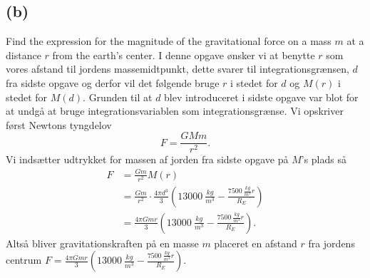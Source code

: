 \documentclass[12pt]{article}
\theoremstyle{definition}
\begin{document}
\subsection*{(b)}
Find the expression for the magnitude of the gravitational force on a mass $m$ at a distance $r$ from the earth's center.
\bigbreak
I denne opgave ønsker vi at benytte $r$ som vores afstand til jordens massemidtpunkt, dette svarer til integrationsgrænsen, $d$ fra sidste opgave og derfor vil det følgende bruge $r$ i stedet for $d$ og $M(r)$ i stedet for $M(d)$. Grunden til at $d$ blev introduceret i sidste opgave var blot for at undgå at bruge integrationsvariablen som integrationsgrænse.  Vi opskriver først Newtons tyngdelov
\[ 
  F = \frac{GMm}{r^2}
.\]
Vi indsætter udtrykket for massen af jorden fra sidste opgave på $M$'s plads så
\begin{align*}
  F &= \frac{Gm}{r^2}M(r) \\
  &= \frac{Gm}{r^2} \cdot \frac{4\pi d^3}{3} \left( \qty{13000}{\frac{kg}{m^3}} - \frac{\qty{7500}{\frac{kg}{m^3}}r}{R_E} \right) \\
  &=  \frac{4\pi G m r}{3} \left( \qty{13000}{\frac{kg}{m^3}} - \frac{\qty{7500}{\frac{kg}{m^3}} r}{R_E} \right)
.\end{align*}
Altså bliver gravitationskraften på en masse $m$ placeret en afstand $r$ fra jordens centrum \underline{\underline{$F = \frac{4\pi G m r}{3} \left( \qty{13000}{\frac{kg}{m^3}} - \frac{\qty{7500}{\frac{kg}{m^3}} r}{R_E} \right)$}}.
\end{document}
